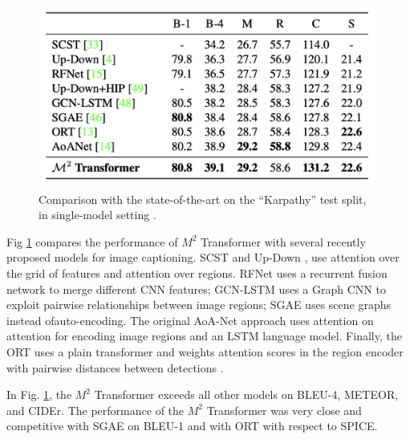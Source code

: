 \documentclass[
]{krantz}
\begin{document}
\begin{figure}

{\centering \includegraphics[width=1\linewidth]{figures/02-01/02-02 compare2} 

}

\caption{Comparison with the state-of-the-art on the ``Karpathy'' test split, in single-model setting \citep{cornia2020m2}.}\label{fig:compare2}
\end{figure}



Fig \ref{fig:compare2} compares the performance of \(M^2\) Transformer with several recently proposed models for image captioning.
SCST \citep{8099614} and Up-Down \citep{8578734}, use attention over the grid of features and attention over regions. RFNet \citep{renet} uses a recurrent fusion network to merge different CNN features; GCN-LSTM \citep{GCN-LSTM} uses a Graph CNN to exploit pairwise relationships between image regions; SGAE \citep{Yang_2019_CVPR} uses scene graphs instead ofauto-encoding. The original AoA-Net \citep{huang1} approach uses attention on attention for encoding image regions and an LSTM language model. Finally, the ORT \citep{HerdadeKBS19} uses a plain transformer and weights attention scores in the region encoder with pairwise distances between detections \citep{cornia2020m2}.

In Fig. \ref{fig:compare2}, the \(M^2\) Transformer exceeds all other models on BLEU-4, METEOR, and CIDEr. The performance of the \(M^2\) Transformer was very close and competitive with SGAE on BLEU-1 and with ORT with respect to SPICE.
\end{document}
